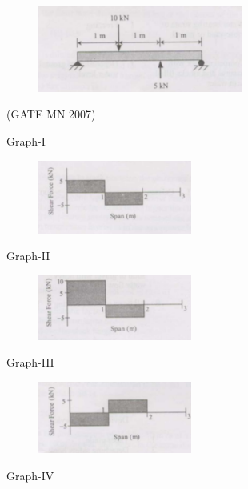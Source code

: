 \documentclass[journal]{IEEEtran}
\begin{document}
\begin{enumerate}
\begin{figure}[H]
    \centering
\includegraphics[width=0.6\textwidth]{Screenshot_2025_0812_143315.png}
\caption{}
    \label{fig:Q43}
\end{figure}
\hfill (GATE MN 2007)
\begin{multicols}{2}
	Graph-I \\
	\begin{figure}[H]
\includegraphics[width=0.45\textwidth]{Screenshot_2025_0812_143545.png} \\
\caption{}
\label{fig:Q43option1}
 \end{figure}
Graph-II \\
\begin{figure}[H]
\includegraphics[width=0.45\textwidth]{Screenshot_2025_0812_143610.png} \\
\caption{}
  \label{fig:Q43option2}
  \end{figure}
Graph-III \\
\begin{figure}[H]
\includegraphics[width=0.45\textwidth]{Screenshot_2025_0812_144908.png} \\
\caption{}
  \label{fig:Q43option3}
  \end{figure}
Graph-IV \\

\end{multicols}
\end{enumerate}
\end{document}
